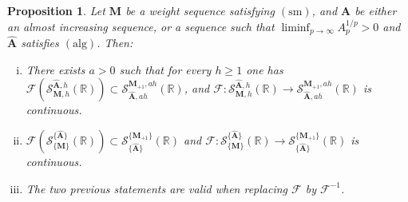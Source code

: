 \documentclass[12pt,a4paper]{article}
\newcommand{\R}{\mathbb{R}}
\newcommand{\M}{{\boldsymbol{M}}}
\newcommand{\A}{{\boldsymbol{A}}}
\newcommand{\hA}{\widehat{{\boldsymbol{A}}}}
\newcommand{\alg}{\operatorname{(alg)}}
\newcommand{\sm}{\operatorname{(sm)}}
\theoremstyle{plain}
\newtheorem{proposition}[theorem]{Proposition}
\theoremstyle{definition}
\numberwithin{equation}{section}
\begin{document}
\begin{proposition}\label{Fourier-contention-dm}
Let $\M$ be a weight sequence satisfying $\sm$, and $\A$ be either an almost increasing sequence, or a sequence such that $\liminf_{p\to\infty}A_p^{1/p}>0$ and $\hA$ satisfies $\alg$. Then:
\begin{enumerate}[(i)]
\item There exists $a>0$ such that for every $h\ge 1$ one has $\mathcal{F}(\mathcal{S}^{\hA,h}_{\M,h}(\R))\subset \mathcal{S}^{\M_{+1},ah}_{\hA,ah}(\R)$, and $\mathcal{F}\colon \mathcal{S}^{\hA,h}_{\M,h}(\R)\to \mathcal{S}^{\M_{+1},ah}_{\hA,ah}(\R)$ is continuous.
\item  $\mathcal{F}(\mathcal{S}^{\{\hA\}}_{\{\M\}}(\R))\subset \mathcal{S}^{\{\M_{+1}\}}_{\{\hA\}}(\R)$ and $\mathcal{F}\colon\mathcal{S}^{\{\hA\}}_{\{\M\}}(\R)\to \mathcal{S}^{\{\M_{+1}\}}_{\{\hA\}}(\R)$ is continuous.
\item The two previous statements are valid when replacing $\mathcal{F}$ by $\mathcal{F}^{-1}$.
\end{enumerate}
\end{proposition}
\end{document}
